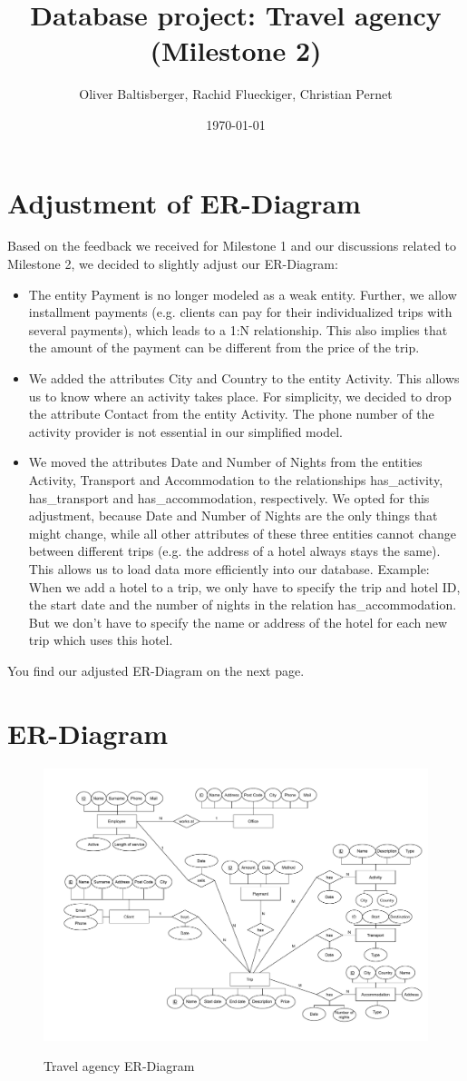 \documentclass{article}
\title{Database project: Travel agency \\ (Milestone 2)}
\author{Oliver Baltisberger, Rachid Flueckiger, Christian Pernet}
\date{\today}
\begin{document}
	\maketitle
	
	\section*{Adjustment of ER-Diagram}
	Based on the feedback  we received for Milestone 1 and our discussions related to Milestone 2, we decided to slightly adjust our ER-Diagram:
	\begin{itemize}
		\item The entity Payment is no longer modeled as a weak entity. Further, we allow installment payments (e.g. clients can pay for their individualized trips with several payments), which leads to a 1:N relationship.
		This also implies that the amount of the payment can be different from the price of the trip.
		\item We added the attributes City and Country to the entity Activity. This allows us to know where an activity takes place.
		For simplicity, we decided to drop the attribute Contact from the entity Activity. The phone number of the activity provider is not essential in our simplified model.
		\item We moved the attributes Date and Number of Nights from the entities Activity, Transport and Accommodation to the relationships has\_activity, has\_transport and has\_accommodation, respectively.
		We opted for this adjustment, because Date and Number of Nights are the only things that might change, while all other attributes of these three entities cannot change between different trips (e.g. the address of a hotel always stays the same).
		This allows us to load data more efficiently into our database.
		Example: When we add a hotel to a trip, we only have to specify the trip and hotel ID, the start date and the number of nights in the relation has\_accommodation.
		But we don't have to specify the name or address of the hotel for each new trip which uses this hotel.
	\end{itemize}
	
You find our adjusted ER-Diagram on the next page.
	\newpage
	
	\section*{ER-Diagram}
	\begin{figure}[htbp]
		\centering
			\includegraphics[width=1.15\textwidth, angle=90]{../Diagramm.pdf}
		\label{ER-Model}
		\caption{Travel agency ER-Diagram}
	\end{figure}
	
\end{document}
